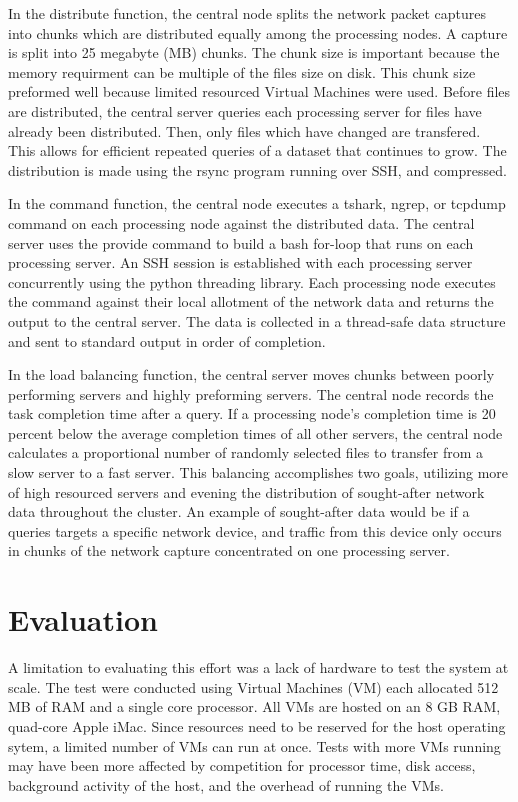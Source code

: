 \documentclass{article}
\begin{document}
\begin{multicols}{2}
In the distribute function,  the central node splits the network packet captures into chunks which are distributed equally among the processing nodes.  A capture is split into 25 megabyte (MB) chunks. The chunk size is important because the memory requirment can be multiple of the files size on disk. This chunk size preformed well because limited resourced Virtual Machines were used.  Before files are distributed, the central server queries each processing server for files have already been distributed. Then, only files which have changed are transfered.  This allows for efficient repeated queries of a dataset that continues to grow. The distribution is made using the rsync program running over SSH, and compressed.     

In the command function, the central node executes a tshark, ngrep, or tcpdump command on each processing node against the distributed data. The central server uses the provide command to build a bash for-loop that runs on each processing server. An SSH session is established with each processing server concurrently using the python threading library.  Each processing node executes the command against their local allotment of the network data and returns the output to the central server. The data is collected in a thread-safe data structure and sent to standard output in order of completion.

In the load balancing function, the central server moves chunks between poorly performing servers and highly preforming servers.  The central node records the task completion time after a query.  If a processing node's completion time is 20 percent below the average completion times of all other servers, the central node calculates a proportional number of randomly selected files to transfer from a slow server to a fast server.  This balancing accomplishes two goals, utilizing more of high resourced servers and evening the distribution of sought-after network data throughout the cluster.  An example of sought-after data would be if a queries targets a specific network device, and traffic from this device only occurs in chunks of the network capture concentrated on one processing server.

\section*{Evaluation} 

A limitation to evaluating this effort was a lack of hardware to test the system at scale. The test were conducted using Virtual Machines (VM) each allocated 512 MB of RAM and a single core processor.  All VMs are hosted on an 8 GB RAM, quad-core Apple iMac. Since resources need to be reserved for the host operating sytem, a limited number of VMs can run at once.  Tests with more VMs running may have been more affected by competition for processor time, disk access, background activity of the host, and the overhead of running the VMs.


\end{multicols}
\end{document}
